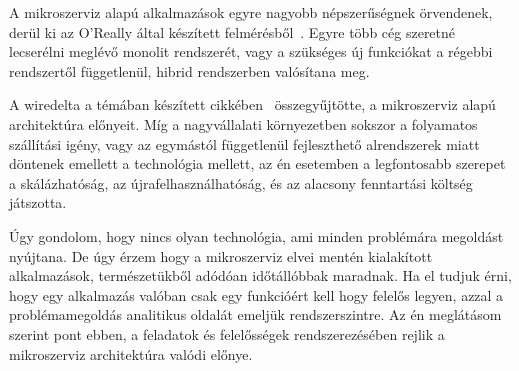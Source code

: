 A mikroszerviz alapú alkalmazások egyre nagyobb népszerűségnek örvendenek, derül ki az \foreignlanguage{british}{O'Really} által készített felmérésből~\cite{OReally}. Egyre több cég szeretné lecserélni meglévő monolit rendszerét, vagy a szükséges új funkciókat a régebbi rendszertől függetlenül, hibrid rendszerben valósítana meg.

A \foreignlanguage{british}{wiredelta} a témában készített cikkében~\cite{wiredelta} összegyűjtötte, a mikroszerviz alapú architektúra előnyeit. Míg a nagyvállalati környezetben sokszor a folyamatos szállítási igény, vagy az egymástól függetlenül fejleszthető alrendszerek miatt döntenek emellett a technológia mellett, az én esetemben a legfontosabb szerepet a skálázhatóság, az újrafelhasználhatóság, és az alacsony fenntartási költség játszotta.

Úgy gondolom, hogy nincs olyan technológia, ami minden problémára megoldást nyújtana. De úgy érzem hogy a mikroszerviz elvei mentén kialakított alkalmazások, természetükből adódóan időtállóbbak maradnak. Ha el tudjuk érni, hogy egy alkalmazás valóban csak egy funkcióért kell hogy felelős legyen, azzal a problémamegoldás analitikus oldalát  emeljük rendszerszintre. Az én meglátásom szerint pont ebben, a feladatok és felelősségek rendszerezésében rejlik a mikroszerviz architektúra valódi előnye.